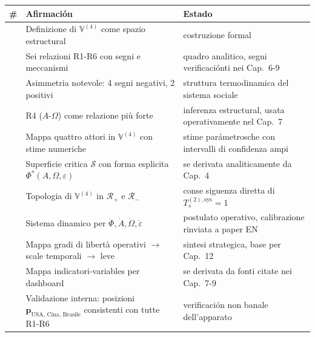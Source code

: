 {\def\LTcaptype{none} %
{\small\begin{longtable}[]{@{}
  >{\raggedright\arraybackslash}p{}
  >{\raggedright\arraybackslash}p{}
  >{\raggedright\arraybackslash}p{}@{}}
\toprule\noalign{}
\begin{minipage}[b]{\linewidth}\raggedright
\#
\end{minipage} & \begin{minipage}[b]{\linewidth}\raggedright
Afirmación
\end{minipage} & \begin{minipage}[b]{\linewidth}\raggedright
Estado
\end{minipage} \\
\midrule\noalign{}
\endhead
\bottomrule\noalign{}
\endlastfoot
1 & Definizione di \(\mathbb{V}^{(4)}\) come spazio estructural &
\Hypoth{} costruzione formal \\
2 & Sei relazioni R1-R6 con segni e meccanismi & \Hypoth{} quadro
analitico, segni verificaciónti nei Cap.~6-9 \\
3 & Asimmetria notevole: 4 segni negativi, 2 positivi & \Proved{}
struttura termodinamica del sistema sociale \\
4 & R4 (\(A\)-\(\Omega\)) come relazione più forte & \Hypoth{} inferenza
estructural, usata operativamente nel Cap.~7 \\
5 & Mappa quattro attori in \(\mathbb{V}^{(4)}\) con stime numeriche &
\Conj{} stime parámetrosche con intervalli di confidenza ampi \\
6 & Superficie critica \(\mathcal{S}\) con forma esplicita
\(\Phi^*(A, \Omega, \varepsilon)\) & \Proved{} se derivata analiticamente
da Cap.~4 \\
7 & Topologia di \(\mathbb{V}^{(4)}\) in \(\mathcal{R}_+\) e
\(\mathcal{R}_-\) & \Proved{} conse siguenza diretta di
\(T_s^{(2),\text{sys}} = 1\) \\
8 & Sistema dinamico per
\(\dot\Phi, \dot A, \dot\Omega, \dot\varepsilon\) & \Hypoth{} postulato
operativo, calibrazione rinviata a paper EN \\
9 & Mappa gradi di libertà operativi \(\to\) scale temporali \(\to\)
leve & \Hypoth{} sintesi strategica, base per Cap.~12 \\
10 & Mappa indicatori-variables per dashboard & \Proved{} se derivata da
fonti citate nei Cap.~7-9 \\
11 & Validazione interna: posizioni
\(\boldsymbol{p}_{\text{USA, Cina, Brasile}}\) consistenti con tutte
R1-R6 & \Proved{} verificación non banale dell'apparato \\
\end{longtable}}
}



